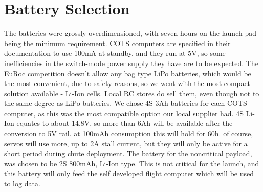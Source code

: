 \documentclass{article}
\begin{document}
\section{Battery Selection}
The batteries were grossly overdimensioned, with seven hours on the launch pad being the minimum requirement. COTS computers are specified in their documentation to use 100mA at standby, and they run at 5V, so some inefficiencies in the switch-mode power supply they have are to be expected. The EuRoc competition doesn't allow any bag type LiPo batteries, which would be the most convenient, due to safety reasons, so we went with the most compact solution available - Li-Ion cells. Local RC stores do sell them, even though not to the same degree as LiPo batteries. We chose 4S 3Ah batteries for each COTS computer, as this was the most compatible option our local supplier had. 4S Li-Ion equates to about 14.8V, so more than 6Ah will be available after the conversion to 5V rail. at 100mAh consumption this will hold for 60h. of course, servos will use more, up to 2A stall current, but they will only be active for a short period during chute deployment. The battery for the noncritical payload, was chosen to be 2S 800mAh, Li-Ion type. This is not critical for the launch, and this battery will only feed the self developed flight computer which will be used to log data. 
\end{document}
